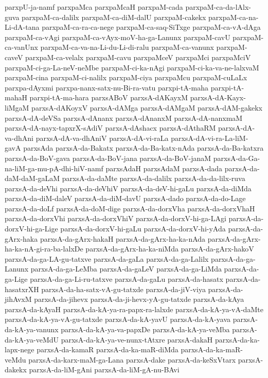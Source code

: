{parxpU-ja-namf
parxpaMca
parxpaMcaH
parxpaM-cada
parxpaM-ca-da-lAlx-guva
parxpaM-ca-dalilx
parxpaM-ca-diM-dalU
parxpaM-cakekx
parxpaM-ca-na-Li-dA-tana
parxpaM-ca-ra-ca-nege
parxpaM-ca-saq-SiTxge
parxpaM-ca-vA-dAga
parxpaM-ca-vAgi
parxpaM-ca-vAyx-moV-ha-ga-Lanunx
parxpaM-cavU
parxpaM-ca-vanUnx
parxpaM-ca-va-na-Li-du-Li-di-ralu
parxpaM-ca-vanunx
parxpaM-caveV
parxpaM-ca-velalx
parxpaM-cavu
parxpaMceV
parxpaMci
parxpaMciV
parxpaM-ci-ga-La-neV-neMbe
parxpaM-ci-ka-nAgi
parxpaM-ci-ka-va-ne-lalxvaM
parxpaM-cina
parxpaM-ci-nalilx
parxpaM-ciya
parxpaMcu
parxpaM-cuLaLx
parxpa-dAyxmi
parxpa-nanx-satx-nu-Bi-ra-vatu
parxpi-tA-maha
parxpi-tA-mahaH
parxpi-tA-ma-hara
parxsABoV
parxsA-dAKayxM
parxsA-dA-Kayx-liMgaM
parxsA-dAKoyxV
parxsA-dAMga
parxsA-dAMgaM
parxsA-dAM-gakekx
parxsA-dA-deVSa
parxsA-dAnanx
parxsA-dAnanxM
parxsA-dA-nanxmaM
parxsA-dA-nayx-tapxrX-sAdiV
parxsA-dAshacx
parxsA-dAthaRM
parxsA-dA-va-dhAni
parxsA-dA-va-dhAniV
parxsA-dA-vi-raLa
parxsA-dA-vi-ra-La-liM-gavA
parxsAda
parxsA-da-Bakatx
parxsA-da-Ba-katx-nAda
parxsA-da-Ba-katxra
parxsA-da-BoV-gava
parxsA-da-BoV-jana
parxsA-da-BoV-janaM
parxsA-da-Ga-na-liM-ga-mu-pA-dhi-hiV-namf
parxsAdaH
parxsAdaM
parxsA-dada
parxsA-da-daM-daM-gaLaM
parxsA-da-daMte
parxsA-da-dalilx
parxsA-da-da-lilx-ruva
parxsA-da-deVhi
parxsA-da-deVhiV
parxsA-da-deV-hi-gaLu
parxsA-da-diMda
parxsA-da-diM-daleV
parxsA-da-diM-davU
parxsA-dado
parxsA-da-do-Lage
parxsA-da-doLf
parxsA-da-doM-dige
parxsA-da-dorxVha
parxsA-da-dorxVhaH
parxsA-da-dorxVhi
parxsA-da-dorxVhiV
parxsA-da-dorxV-hi-ga-LAgi
parxsA-da-dorxV-hi-ga-Lige
parxsA-da-dorxV-hi-gaLu
parxsA-da-dorxV-hi-yAda
parxsA-da-gArx-haka
parxsA-da-gArx-hakaH
parxsA-da-gArx-ha-ka-nAda
parxsA-da-gArx-ha-ka-nA-gi-ra-ba-lalxDe
parxsA-da-gArx-ha-ka-niMda
parxsA-da-gArx-hakoV
parxsA-da-ga-LA-gu-tatxve
parxsA-da-gaLa
parxsA-da-ga-Lalilx
parxsA-da-ga-Lanunx
parxsA-da-ga-LeMba
parxsA-da-gaLeV
parxsA-da-ga-LiMda
parxsA-da-ga-Lige
parxsA-da-ga-Li-ru-tatxve
parxsA-da-gaLu
parxsA-da-hasatx
parxsA-da-hasatxrXH
parxsA-da-ha-satx-vA-gu-tatxde
parxsA-da-jiV-viya
parxsA-da-jihAvxM
parxsA-da-jihevx
parxsA-da-ji-hevx-yA-gu-tatxde
parxsA-da-kAya
parxsA-da-kAyaH
parxsA-da-kA-ya-ra-papx-ra-lalxde
parxsA-da-kA-ya-vA-daMte
parxsA-da-kA-ya-vA-gu-tatxde
parxsA-da-kA-yavU
parxsA-da-kA-yava
parxsA-da-kA-ya-vanunx
parxsA-da-kA-ya-va-papxDe
parxsA-da-kA-ya-veMba
parxsA-da-kA-ya-veMdU
parxsA-da-kA-ya-ve-nunx-tAtxre
parxsA-dakaH
parxsA-da-ka-lapx-nege
parxsA-da-kamaR
parxsA-da-ka-maR-diMda
parxsA-da-ka-maR-veMdu
parxsA-da-karx-maM-ga-Lana
parxsA-dake
parxsA-da-keSxVtarx
parxsA-dakekx
parxsA-da-liM-gAni
parxsA-da-liM-gA-nu-BAvi
}
